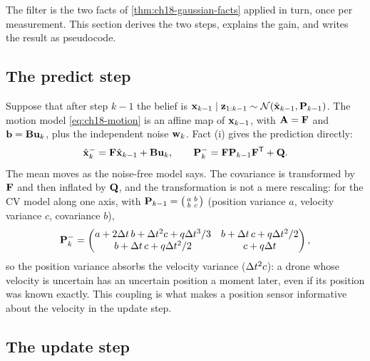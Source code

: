 The filter is the two facts of \cref{thm:ch18-gaussian-facts} applied in
turn, once per measurement. This section derives the two steps, explains the
gain, and writes the result as pseudocode.

\subsection{The predict step}
\label{sec:ch18-predict}

Suppose that after step $k-1$ the belief is
$\mathbf{x}_{k-1}\mid\mathbf{z}_{1:k-1}\sim\mathcal{N}(\hat{\mathbf{x}}_{k-1},\mathbf{P}_{k-1})$.
The motion model \cref{eq:ch18-motion} is an affine map of $\mathbf{x}_{k-1}$,
with $\mathbf{A}=\mathbf{F}$ and $\mathbf{b}=\mathbf{B}\mathbf{u}_k$, plus the independent
noise $\mathbf{w}_k$. Fact (i) gives the prediction directly:
\begin{equation}
  \hat{\mathbf{x}}^-_k=\mathbf{F}\hat{\mathbf{x}}_{k-1}+\mathbf{B}\mathbf{u}_k,\qquad
  \mathbf{P}^-_k=\mathbf{F}\mathbf{P}_{k-1}\mathbf{F}^{\mathsf{T}}+\mathbf{Q}.
  \label{eq:ch18-predict}
\end{equation}
The mean moves as the noise-free model says. The covariance is transformed by
$\mathbf{F}$ and then inflated by $\mathbf{Q}$, and the transformation is not a mere
rescaling: for the CV model along one axis, with
$\mathbf{P}_{k-1}=\begin{psmallmatrix}a&b\\ b&c\end{psmallmatrix}$ (position
variance $a$, velocity variance $c$, covariance $b$),
\begin{equation}
  \mathbf{P}^-_k=\begin{pmatrix}
    a+2\Delta t\,b+\Delta t^2c+q\Delta t^3/3 & b+\Delta t\,c+q\Delta t^2/2\\
    b+\Delta t\,c+q\Delta t^2/2 & c+q\Delta t
  \end{pmatrix},
  \label{eq:ch18-predict-cv}
\end{equation}
so the position variance absorbs the velocity variance ($\Delta t^2c$): a drone
whose velocity is uncertain has an uncertain position a moment later, even
if its position was known exactly. This coupling is what makes a position
sensor informative about the velocity in the update step.

\subsection{The update step}
\label{sec:ch18-update}

